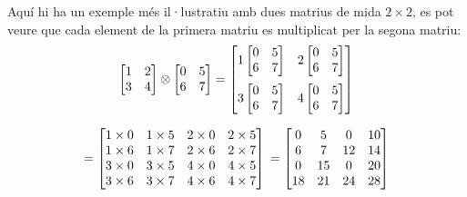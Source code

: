 Aquí hi ha un exemple més il·lustratiu amb dues matrius de mida $2\times2$, es pot veure que cada element de la primera matriu es multiplicat per la segona matriu:
\begin{equation*}
\begin{bmatrix}
	1 & 2 \\
	3 & 4 \\
\end{bmatrix} \otimes
\begin{bmatrix}
	0 & 5 \\
	6 & 7 \\
\end{bmatrix} =
\begin{bmatrix}
1 \begin{bmatrix}
	0 & 5 \\
	6 & 7 \\
\end{bmatrix} & 
2 \begin{bmatrix}
	0 & 5 \\
	6 & 7 \\
\end{bmatrix} \vspace{6pt} \\ 
3 \begin{bmatrix}
	0 & 5 \\
	6 & 7 \\
\end{bmatrix} & 
4 \begin{bmatrix}
	0 & 5 \\
	6 & 7 \\
\end{bmatrix}
\end{bmatrix}
\end{equation*}

\begin{equation*}
	= 
\begin{bmatrix}
1\times 0 & 1\times 5 & 2\times 0 & 2\times 5 \\
1\times 6 & 1\times 7 & 2\times 6 & 2\times 7 \\
3\times 0 & 3\times 5 & 4\times 0 & 4\times 5 \\
3\times 6 & 3\times 7 & 4\times 6 & 4\times 7 \\
\end{bmatrix} \\
= 
\begin{bmatrix}
0 &  5 &  0 & 10 \\
6 &  7 & 12 & 14 \\
0 & 15 &  0 & 20 \\
18 & 21 & 24 & 28
\end{bmatrix}
\end{equation*}

